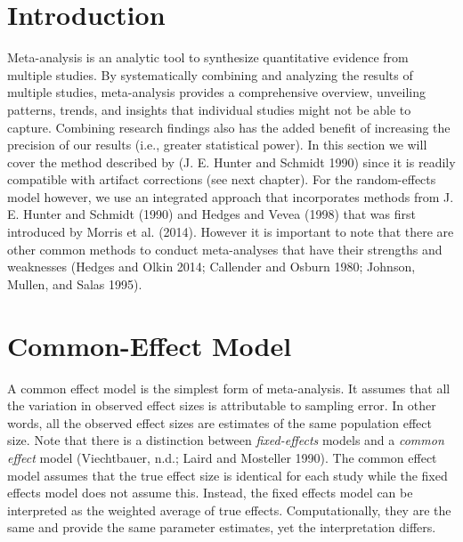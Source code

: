 \documentclass[
  letterpaper,
  DIV=11,
  numbers=noendperiod]{scrreprt}
\begin{document}
\hypertarget{introduction-7}{%
\section{Introduction}\label{introduction-7}}

Meta-analysis is an analytic tool to synthesize quantitative evidence
from multiple studies. By systematically combining and analyzing the
results of multiple studies, meta-analysis provides a comprehensive
overview, unveiling patterns, trends, and insights that individual
studies might not be able to capture. Combining research findings also
has the added benefit of increasing the precision of our results (i.e.,
greater statistical power). In this section we will cover the method
described by (J. E. Hunter and Schmidt 1990) since it is readily
compatible with artifact corrections (see next chapter). For the
random-effects model however, we use an integrated approach that
incorporates methods from J. E. Hunter and Schmidt (1990) and Hedges and
Vevea (1998) that was first introduced by Morris et al. (2014). However
it is important to note that there are other common methods to conduct
meta-analyses that have their strengths and weaknesses (Hedges and Olkin
2014; Callender and Osburn 1980; Johnson, Mullen, and Salas 1995).

\hypertarget{common-effect-model}{%
\section{Common-Effect Model}\label{common-effect-model}}

A common effect model is the simplest form of meta-analysis. It assumes
that all the variation in observed effect sizes is attributable to
sampling error. In other words, all the observed effect sizes are
estimates of the same population effect size. Note that there is a
distinction between \emph{fixed-effects} models and a \emph{common
effect} model (Viechtbauer, n.d.; Laird and Mosteller 1990). The common
effect model assumes that the true effect size is identical for each
study while the fixed effects model does not assume this. Instead, the
fixed effects model can be interpreted as the weighted average of true
effects. Computationally, they are the same and provide the same
parameter estimates, yet the interpretation differs.
\end{document}
